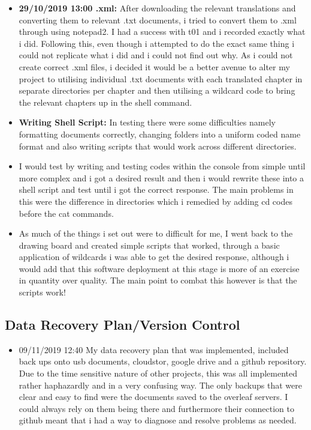 \documentclass{article}
\begin{document}
\begin{itemize}
    \item{\textbf{29/10/2019 13:00 .xml:} After downloading the relevant translations and converting them to relevant .txt documents, i tried to convert them to .xml through using notepad2. I had a success with t01 and i recorded exactly what i did. Following this, even though i attempted to do the exact same thing i could not replicate what i did and i could not find out why. As i could not create correct .xml files, i decided it would be a better avenue to alter my project to utilising individual .txt documents with each translated chapter in separate directories per chapter and then utilising a wildcard code to bring the relevant chapters up in the shell command.}
    
    \item{\textbf{Writing Shell Script:} In testing there were some difficulties namely formatting documents correctly, changing folders into a uniform coded name format and also writing scripts that would work across different directories. }
    \item{I would test by writing and testing codes within the console from simple until more complex and i got a desired result and then i would rewrite these into a shell script and test until i got the correct response. The main problems in this were the difference in directories which i remedied by adding cd codes before the cat commands.}
    \item{As much of the things i set out were to difficult for me, I went back to the drawing board and created simple scripts that worked, through a basic application of wildcards i was able to get the desired response, although i would add that this software deployment at this stage is more of an exercise in quantity over quality. The main point to combat this however is that the scripts work!}
    
   
\end{itemize}



\subsection{Data Recovery Plan/Version Control}

\begin{itemize}
\item{09/11/2019 12:40 My data recovery plan that was implemented, included back ups onto usb documents, cloudstor, google drive and a github repository. Due to the time sensitive nature of other projects, this was all implemented rather haphazardly and in a very confusing way. The only backups that were clear and easy to find were the documents saved to the overleaf servers. I could always rely on them being there and furthermore their connection to github meant that i had a way to diagnose and resolve problems as needed. }
\end{itemize}
\end{document}

